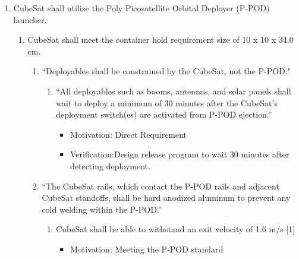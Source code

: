 \begin{enumerate}
\begin{enumerate}
\begin{enumerate}
\begin{enumerate}
\begin{itemize}
                        \item Motivation: Delicate components such as PCBs and antenna have natural frequencies which must be avoided to avoid resonance. Resonance could result in the failure of components.
                        \item Verification: Use ANSYS’s model analysis features on specific parts and on the assembled CAD model.
                    \end{itemize}
        \end{enumerate}
        \end{enumerate}
    \end{enumerate}  %
    \item CubeSat shall utilize the Poly Picosatellite Orbital Deployer (P-POD) launcher.
    \begin{enumerate}
        \item CubeSat shall meet the container hold requirement size of 10 x 10 x 34.0 cm. 
        \begin{enumerate}
            \item  “Deployables shall be constrained by the CubeSat, not the P-POD." \cite{CSS} 
                \begin{enumerate}
                    \item “All deployables such as booms, antennas, and solar panels shall wait to deploy a minimum of 30 minutes after the CubeSat's deployment switch(es) are activated from P-POD ejection.” \cite{CSS} 
                        \begin{itemize}
                            \item Motivation: Direct Requirement
                            \item Verification:Design release program to wait 30 minutes after detecting deployment. 
                        \end{itemize}
                \end{enumerate}
            \item  “The CubeSat rails, which contact the P-POD rails and adjacent CubeSat standoffs, shall be hard anodized aluminum to prevent any cold welding within the P-POD.” \cite{CSS} 
                \begin{enumerate}
                    \item CubeSat shall be able to withstand an exit velocity of 1.6 m/s [1] 
                           \begin{itemize}
                                \item Motivation: Meeting the P-POD standard

\end{itemize}
\end{enumerate}
\end{enumerate}
\end{enumerate}
\end{enumerate}
